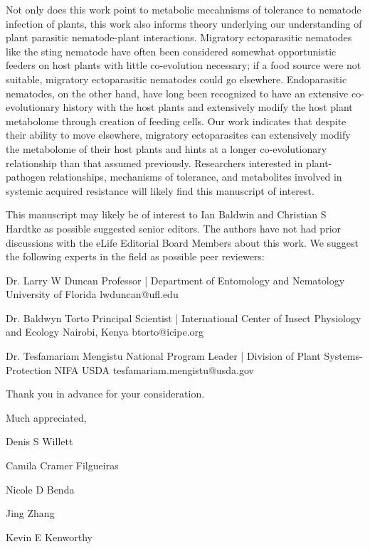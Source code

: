 \documentclass{article}
\begin{document}
Not only does this work point to metabolic mecahnisms of tolerance to nematode infection of plants, this work also informs theory underlying our understanding of plant parasitic nematode-plant interactions.  Migratory ectoparasitic nematodes like the sting nematode have often been considered somewhat opportunistic feeders on host plants with little co-evolution necessary; if a food source were not suitable, migratory ectoparasitic nematodes could go elsewhere.  Endoparasitic nematodes, on the other hand, have long been recognized to have an extensive co-evolutionary history with the host plants and extensively modify the host plant metabolome through creation of feeding cells.  Our work indicates that despite their ability to move elsewhere, migratory ectoparasites can extensively modify the metabolome of their host plants and hints at a longer co-evolutionary relationship than that assumed previously.  Researchers interested in plant-pathogen relationships, mechanisms of tolerance, and metabolites involved in systemic acquired resistance will likely find this manuscript of interest.  


This manuscript may likely be of interest to Ian Baldwin and Christian S Hardtke as possible suggested senior editors. The authors have not had prior discussions with the eLife Editorial Board Members about this work.  We suggest the following experts in the field as possible peer reviewers:


\setlength{\parindent}{0cm}
\begin{addmargin}[1in]{}

Dr. Larry W Duncan \newline
Professor | Department of Entomology and Nematology \newline
University of Florida \newline
lwduncan@ufl.edu \newline

Dr. Baldwyn Torto \newline
Principal Scientist | International Center of Insect Physiology and Ecology \newline
Nairobi, Kenya \newline
btorto@icipe.org \newline

Dr. Tesfamariam Mengistu \newline
National Program Leader | Division of Plant Systems-Protection \newline
NIFA USDA \newline
tesfamariam.mengistu@usda.gov \newline

\end{addmargin}

Thank you in advance for your consideration.  

\vspace{2em}

Much appreciated, \newline

\vspace{1em}

Denis S Willett
\vspace{0.48em}

Camila Cramer Filgueiras
\vspace{0.48em}

Nicole D Benda
\vspace{0.48em}

Jing Zhang
\vspace{0.48em} 

Kevin E Kenworthy
\end{document}
